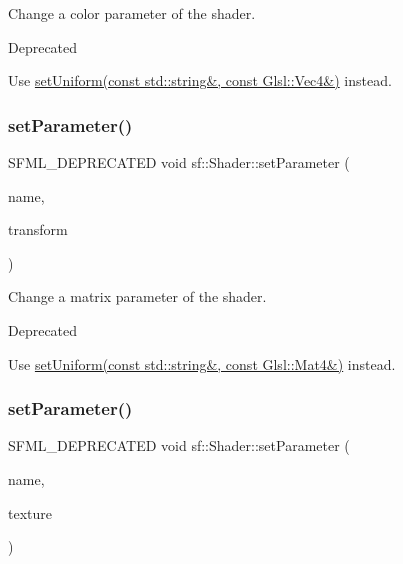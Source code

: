 Change a color parameter of the shader. 

\begin{DoxyRefDesc}{Deprecated}
\item[\hyperlink{deprecated__deprecated000011}{Deprecated}]Use \hyperlink{classsf_1_1_shader_abc1aee8343800680fd62e1f3d43c24bf}{set\+Uniform(const std\+::string\&, const Glsl\+::\+Vec4\&)} instead.\end{DoxyRefDesc}
\mbox{\label{classsf_1_1_shader_a398a802fc5295ab69b0317892b0f0c75}} 
\subsubsection{\texorpdfstring{set\+Parameter()}{setParameter()}\hspace{0.1cm}{\footnotesize\ttfamily [8/10]}}
{\footnotesize\ttfamily S\+F\+M\+L\+\_\+\+D\+E\+P\+R\+E\+C\+A\+T\+ED void sf\+::\+Shader\+::set\+Parameter (\begin{DoxyParamCaption}\item[{const std\+::string \&}]{name,  }\item[{const \hyperlink{classsf_1_1_transform}{Transform} \&}]{transform }\end{DoxyParamCaption})}



Change a matrix parameter of the shader. 

\begin{DoxyRefDesc}{Deprecated}
\item[\hyperlink{deprecated__deprecated000012}{Deprecated}]Use \hyperlink{classsf_1_1_shader_aca5c55c4a3b23d21e33dbdaab7990755}{set\+Uniform(const std\+::string\&, const Glsl\+::\+Mat4\&)} instead.\end{DoxyRefDesc}
\mbox{\label{classsf_1_1_shader_a08c7cafd4f73ab898319c4fd7d8b5501}} 
\subsubsection{\texorpdfstring{set\+Parameter()}{setParameter()}\hspace{0.1cm}{\footnotesize\ttfamily [9/10]}}
{\footnotesize\ttfamily S\+F\+M\+L\+\_\+\+D\+E\+P\+R\+E\+C\+A\+T\+ED void sf\+::\+Shader\+::set\+Parameter (\begin{DoxyParamCaption}\item[{const std\+::string \&}]{name,  }\item[{const \hyperlink{classsf_1_1_texture}{Texture} \&}]{texture }\end{DoxyParamCaption})}



